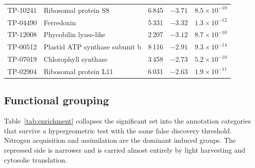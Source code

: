 \begin{table}[t]
\begin{tabular}{llrrr}
    TP-10241 & Ribosomal protein S8              &  6\,845 & $-3.71$ & $8.5 \times 10^{-10}$ \\
    TP-04490 & Ferredoxin                        &  5\,331 & $-3.32$ & $1.3 \times 10^{-12}$ \\
    TP-12008 & Phycobilin lyase-like             &  2\,207 & $-3.12$ & $8.7 \times 10^{-10}$ \\
    TP-00512 & Plastid ATP synthase subunit b    &  8\,116 & $-2.91$ & $9.3 \times 10^{-14}$ \\
    TP-07019 & Chlorophyll synthase              &  3\,458 & $-2.73$ & $5.2 \times 10^{-10}$ \\
    TP-02904 & Ribosomal protein L11             &  6\,031 & $-2.63$ & $1.9 \times 10^{-11}$ \\
    \bottomrule
  \end{tabular}
\end{table}

\subsection{Functional grouping}

Table~\ref{tab:enrichment} collapses the significant set into the annotation
categories that survive a hypergeometric test with the same false discovery
threshold. Nitrogen acquisition and assimilation are the dominant induced
groups. The repressed side is narrower and is carried almost entirely by
light harvesting and cytosolic translation.

